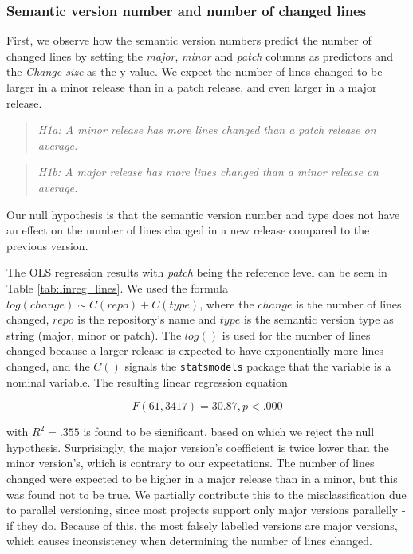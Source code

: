 \subsubsection{Semantic version number and number of changed lines}

First, we observe how the semantic version numbers predict the number of changed lines by setting the \textit{major}, \textit{minor} and \textit{patch} columns as predictors and the \textit{Change size} as the y value. We expect the number of lines changed to be larger in a minor release than in a patch release, and even larger in a major release.

\begin{quote}
    \textit{H1a: A minor release has more lines changed than a patch release on average.}
\end{quote}
\begin{quote}
    \textit{H1b: A major release has more lines changed than a minor release on average.}
\end{quote}

Our null hypothesis is that the semantic version number and type does not have an effect on the number of lines changed in a new release compared to the previous version.

The OLS regression results with \textit{patch} being the reference level can be seen in Table \ref{tab:linreg_lines}. We used the formula $ log(change) \sim C(repo) + C(type) $, where the $change$ is the number of lines changed, $repo$ is the repository's name and $type$ is the semantic version type as string (major, minor or patch). The $log()$ is used for the number of lines changed because a larger release is expected to have exponentially more lines changed, and the $C()$ signals the \texttt{statsmodels} package that the variable is a nominal variable. The resulting linear regression equation 

\[ F(61,3417) = 30.87, p < .000 \]

with $R^2 = .355$ is found to be significant, based on which we reject the null hypothesis. Surprisingly, the major version's coefficient is twice lower than the minor version's, which is contrary to our expectations. The number of lines changed were expected to be higher in a major release than in a minor, but this was found not to be true. We partially contribute this to the misclassification due to parallel versioning, since most projects support only major versions parallelly - if they do. Because of this, the most falsely labelled versions are major versions, which causes inconsistency when determining the number of lines changed.

